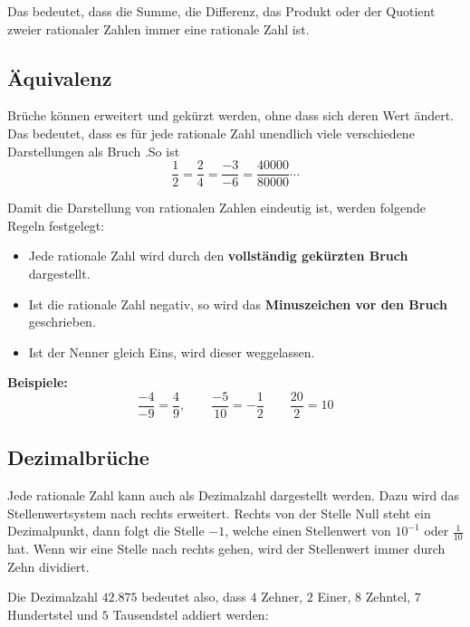 Das bedeutet, dass die Summe, die Differenz, das Produkt oder der Quotient zweier rationaler Zahlen immer eine rationale Zahl ist.

\subsection{Äquivalenz}

Brüche können erweitert und gekürzt werden, ohne dass sich deren Wert ändert. Das bedeutet, dass es für jede rationale Zahl unendlich viele verschiedene Darstellungen als Bruch .So ist
\[
  \frac{1}{2} = \frac{2}{4} = \frac{-3}{-6} = \frac{40000}{80000} \cdots
\]

Damit die Darstellung von rationalen Zahlen eindeutig ist, werden folgende Regeln festgelegt:
\begin{itemize}[noitemsep]
  \item Jede rationale Zahl wird durch den \textbf{vollständig gekürzten Bruch} dargestellt.
  \item Ist die rationale Zahl negativ, so wird das \textbf{Minuszeichen vor den Bruch} geschrieben.
  \item Ist der Nenner gleich Eins, wird dieser weggelassen.
\end{itemize}

\begin{example}
  \textbf{Beispiele:}
  \[
    \frac{-4}{-9} = \frac{4}{9}, \qquad \frac{-5}{10} = -\frac{1}{2} \qquad \frac{20}{2} = 10
  \]
\end{example}

\subsection{Dezimalbrüche}

Jede rationale Zahl kann auch als Dezimalzahl dargestellt werden. Dazu wird das Stellenwertsystem nach rechts erweitert. Rechts von der Stelle Null steht ein Dezimalpunkt, dann folgt die Stelle $-1$, welche einen Stellenwert von $10^{-1}$ oder $\frac{1}{10}$ hat. Wenn wir eine Stelle nach rechts gehen, wird der Stellenwert immer durch Zehn dividiert.

Die Dezimalzahl $42.875$ bedeutet also, dass $4$ Zehner, $2$ Einer, $8$ Zehntel, $7$ Hundertstel und $5$ Tausendstel addiert werden:


